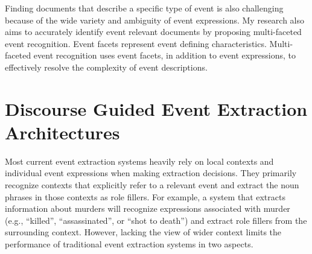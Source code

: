 Finding documents that describe a specific type of event is also challenging 
because of the wide variety and ambiguity of event expressions. 
My research also aims to accurately identify event relevant documents 
 by proposing multi-faceted event recognition. Event facets represent 
event defining characteristics. Multi-faceted event recognition uses 
event facets, in addition to event expressions, to effectively resolve 
the complexity of event descriptions.

\section{Discourse Guided Event Extraction Architectures}

Most current event extraction systems 
heavily rely on local contexts
 and individual event expressions
when making extraction decisions. 
They primarily recognize
contexts that explicitly refer to a relevant event and extract the noun phrases 
in those contexts as role fillers. 
For example, a system that extracts information about
murders will recognize expressions associated with
murder (e.g., ``killed'', ``assassinated'', or ``shot to
death'') and extract role fillers from the surrounding
context. 
However, lacking the view of wider context limits the performance of traditional event extraction systems in 
two aspects. 

